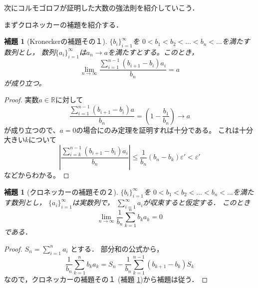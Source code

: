 \documentclass[leqno, a4paper, 12pt]{jsarticle}
\newtheorem{lem}[thm]{補題}
\newcommand{\rr}{\mathbb{R}}
\newcommand{\ep}{\varepsilon}
\begin{document}
次にコルモゴロフが証明した大数の強法則を紹介していこう．

まずクロネッカーの補題を紹介する．
\begin{lem}[Kroneckerの補題その１]\label{lem:kro}
$\{b_{i}\}_{i=1}^{\infty}$を
$0<b_1<b_2<\dots <b_n<\dots$を満たす数列とし，
数列$\{a_{i}\}_{i=1}^{\infty}$は$a_n\to a$を満たすとする。このとき，
\[
\lim_{n\to \infty}\frac{\sum_{i=1}^{n-1}(b_{i+1}-b_i)a_i}{b_n}=a
\]
が成り立つ。
\end{lem}
\begin{proof}
実数$a\in \rr$に対して
\[
\frac{\sum_{i=1}^{n-1}(b_{i+1}-b_i)a}{b_n}=\left(1-\frac{b_1}{b_n}\right)\to a
\]
が成り立つので、$a=0$の場合にのみ定理を証明すれば十分である。
これは十分大きい$k$について
\[
\left|\frac{\sum_{i=k}^{n-1}(b_{i+1}-b_i)a_i}{b_n}\right|
\le \frac{1}{b_n}(b_n-b_k)\ep'<\ep'
\]
などからわかる。
\end{proof}
\begin{lem}[クロネッカーの補題その２]\label{lem:kro2}
$\{b_{i}\}_{i=1}^{\infty}$を
$0<b_1<b_2<\dots <b_n<\dots$を満たす数列とし，
$\{a_{i}\}_{i=1}^{\infty}$は実数列で，
$\sum_{i=1}^{\infty}a_i$が収束すると仮定する．
このとき
\[
\lim_{n\to\infty}\frac{1}{b_n}\sum_{k=1}^nb_ka_k=0
\]
である．
\end{lem}
\begin{proof}
$S_n=\sum_{i=1}^na_i$
とする．
部分和の公式から，
\[
\frac{1}{b_n}\sum_{k=1}^nb_ka_k=S_n-\frac{1}{b_n}\sum_{k=1}^{n-1}(b_{k+1}-b_k)S_k
\]
なので，クロネッカーの補題その１ (補題 \ref{lem:kro})から補題は従う．
\end{proof}
\end{document}
